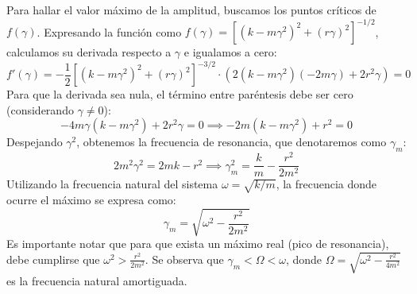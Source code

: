 \begin{center}
\end{center}

Para hallar el valor máximo de la amplitud, buscamos los puntos críticos de $f(\gamma)$. Expresando la función como $f(\gamma) = [(k-m\gamma^2)^2 + (r \gamma)^2]^{-1/2}$, calculamos su derivada respecto a $\gamma$ e igualamos a cero:
\[ f'(\gamma) = -\frac{1}{2} [(k-m\gamma^2)^2 + (r \gamma)^2]^{-3/2} \cdot \left( 2(k-m\gamma^2)(-2m\gamma) + 2 r^2 \gamma \right) = 0 \]
Para que la derivada sea nula, el término entre paréntesis debe ser cero (considerando $\gamma \neq 0$):
\[ -4m\gamma(k - m \gamma^2) + 2 r^2 \gamma = 0 \implies -2m(k - m \gamma^2) + r^2 = 0 \]
Despejando $\gamma^2$, obtenemos la frecuencia de resonancia, que denotaremos como $\gamma_m$:
\[ 2m^2 \gamma^2 = 2mk - r^2 \implies \gamma_m^2 = \frac{k}{m} - \frac{r^2}{2m^2} \]
Utilizando la frecuencia natural del sistema $\omega = \sqrt{k/m}$, la frecuencia donde ocurre el máximo se expresa como:
\[ \gamma_m = \sqrt{\omega^2 - \frac{r^2}{2m^2}} \]
Es importante notar que para que exista un máximo real (pico de resonancia), debe cumplirse que $\omega^2 > \frac{r^2}{2m^2}$. Se observa que $\gamma_m < \Omega < \omega$, donde $\Omega = \sqrt{\omega^2 - \frac{r^2}{4m^2}}$ es la frecuencia natural amortiguada.

